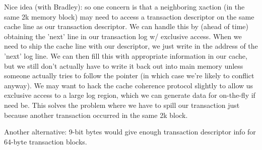 Nice idea (with Bradley): so one concern is that a neighboring xaction
(in the same 2k memory block) may need to access a transaction
descriptor on the same cache line as our transaction descriptor.  We
can handle this by (ahead of time) obtaining the 'next' line in our
transaction log w/ exclusive access.  When we need to ship the cache
line with our descriptor, we just write in the address of the 'next'
log line.  We can then fill this with appropriate information in our
cache, but we still don't actually have to write it back out into main
memory unless someone actually tries to follow the pointer (in which
case we're likely to conflict anyway).  We may want to hack the cache
coherence protocol slightly to allow us exclusive access to a large
log region, which we can generate data for on-the-fly if need be.
This solves the problem where we have to spill our transaction just
because another transaction occurred in the same 2k block.

Another alternative: 9-bit bytes would give enough transaction
descriptor info for 64-byte transaction blocks.


